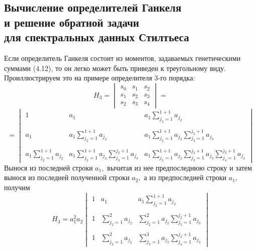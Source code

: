 \documentclass[12 pt, a4 paper]{article}
\theoremstyle{plain}   \newtheorem{Pro}{Задача}
\begin{document}
\subsection{Вычисление определителей Ганкеля \\
и решение обратной
задачи \\
для спектральных данных Стилтьеса}
Если определитель Ганкеля состоит из моментов,
задаваемых генетическими суммами (4.12),
то он легко может быть приведен к треугольному виду.
Проиллюстрируем это на примере определителя 3-го порядка:
\begin{equation*}
  H_3 =
    \begin{vmatrix}
	  s_0 & s_1 & s_2 \\
	  s_1 & s_2 & s_3 \\
	  s_2 & s_3 & s_4
	\end{vmatrix}
	=
\end{equation*}
\begin{equation*}
  =
  \begin{vmatrix}
    1 & a_1 & a_1 \sum _{j_2 =1}^{1+1}a_{j_2} \\
	\; & \; & \; \\
	a_1 & a_1 \sum _{j_2 =1}^{1+1}a_{j_2} &
	  a_1 \sum _{j_2 =1}^{1+1}a_{j_2}
	    \sum _{j_3 =1}^{j_2 +1}a_{j_3} \\
		\; & \; & \; \\
	a_1 \sum _{j_2 =1}^{1+1}a_{j_2} &
	   a_1 \sum _{j_2 =1}^{1+1}a_{j_2}
	     \sum _{j_3 =1}^{j_2 +1}a_{j_3} &
		   a_1 \sum _{j_2 =1}^{1+1}a_{j_2}
		     \sum _{j_3 =1}^{j_2 +1}a_{j_3}
			   \sum _{j_4 =1}^{j_3 +1}a_{j_4}
   \end{vmatrix}
\end{equation*}
Вынося из последней строки
$ a_1 , $
вычитая из нее предпоследнюю строку и затем вынося
из последней полученной строки
$ a_2 , $
а из предпоследней строки
$ a_1 , $
получим
\begin{equation*}
  H_3 =a_1 ^2 a_2
    \begin{vmatrix}
	  1 & a_1 & a_1 \sum _{j_2 =1}^{1+1}a_{j_2} \\
	  \; & \; & \; \\
	  1 & \sum _{j_2 =1}^2 a_{j_2} &
	    \sum _{j_2 =1}^2 a_{j_2}
		  \sum _{j_3 =1}^{j_2 +1}a_{j_3} \\
		  \; & \; & \; \\
	  1 & \sum _{j_2 =1}^2 a_{j_2} &
	    \sum _{j_3 =1}^3 a_{j_3}
		  \sum _{j_4 =1}^{j_3+1}a_{j_3}
	\end{vmatrix}
\end{equation*}
\end{document}
